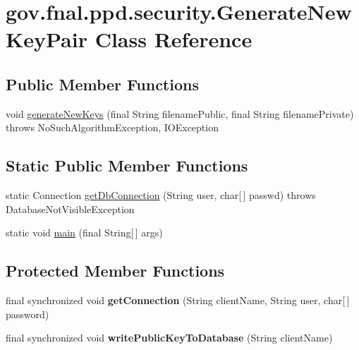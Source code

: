 \hypertarget{classgov_1_1fnal_1_1ppd_1_1security_1_1GenerateNewKeyPair}{\section{gov.\-fnal.\-ppd.\-security.\-Generate\-New\-Key\-Pair Class Reference}
\label{classgov_1_1fnal_1_1ppd_1_1security_1_1GenerateNewKeyPair}
}
\subsection*{Public Member Functions}
\begin{DoxyCompactItemize}
\item 
void \hyperlink{classgov_1_1fnal_1_1ppd_1_1security_1_1GenerateNewKeyPair_a8fd10e2d562feed30edd515a65c65935}{generate\-New\-Keys} (final String filename\-Public, final String filename\-Private)  throws No\-Such\-Algorithm\-Exception, I\-O\-Exception 
\end{DoxyCompactItemize}
\subsection*{Static Public Member Functions}
\begin{DoxyCompactItemize}
\item 
static Connection \hyperlink{classgov_1_1fnal_1_1ppd_1_1security_1_1GenerateNewKeyPair_aee008581c8b456ffcdc83a6396e773eb}{get\-Db\-Connection} (String user, char\mbox{[}$\,$\mbox{]} passwd)  throws Database\-Not\-Visible\-Exception 
\item 
static void \hyperlink{classgov_1_1fnal_1_1ppd_1_1security_1_1GenerateNewKeyPair_afe479a0827a3f54f723f59eda57ae050}{main} (final String\mbox{[}$\,$\mbox{]} args)
\end{DoxyCompactItemize}
\subsection*{Protected Member Functions}
\begin{DoxyCompactItemize}
\item 
\hypertarget{classgov_1_1fnal_1_1ppd_1_1security_1_1GenerateNewKeyPair_a5848fc4da11044885fe5baf92e88a0c4}{final synchronized void {\bfseries get\-Connection} (String client\-Name, String user, char\mbox{[}$\,$\mbox{]} password)}\label{classgov_1_1fnal_1_1ppd_1_1security_1_1GenerateNewKeyPair_a5848fc4da11044885fe5baf92e88a0c4}

\item 
\hypertarget{classgov_1_1fnal_1_1ppd_1_1security_1_1GenerateNewKeyPair_a0df582e5aa3c2c81e890760384247b3d}{final synchronized void {\bfseries write\-Public\-Key\-To\-Database} (String client\-Name)}\label{classgov_1_1fnal_1_1ppd_1_1security_1_1GenerateNewKeyPair_a0df582e5aa3c2c81e890760384247b3d}

\end{DoxyCompactItemize}


